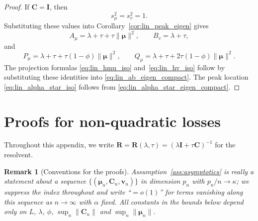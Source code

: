 \documentclass[11pt]{article}
\newcommand{\EE}{\mathbb{E}}
\newcommand{\I}{\mathbf{I}}
\newcommand{\C}{\mathbf{C}}
\newcommand{\bv}{\mathbf{v}}
\newcommand{\bmu}{\boldsymbol{\mu}}
\newcommand{\btheta}{\boldsymbol{\theta}}
\newtheorem{remark}{Remark}
\newcommand{\IS}[1]{\textcolor{blue}{{#1}}}
\begin{document}
\begin{proof}
If \(\C=\I\), then
\[
s_\mu^2=s_v^2=1.
\]
Substituting these values into Corollary~\ref{cor:lin_peak_eigen} gives
\[
A_\mu=\lambda+\tau+\tau\|\bmu\|^2,
\qquad
B_v=\lambda+\tau,
\]
and
\[
P_\mu=\lambda+\tau+\tau(1-\phi)\|\bmu\|^2,
\qquad
Q_\mu=\lambda+\tau+2\tau(1-\phi)\|\bmu\|^2.
\]
The projection formulas \eqref{eq:lin_hmu_iso} and~\eqref{eq:lin_hv_iso}
follow by substituting these identities into
\eqref{eq:lin_ab_eigen_compact}. The peak location
\eqref{eq:lin_alpha_star_iso} follows from
\eqref{eq:lin_alpha_star_eigen_compact}.
\end{proof}
\newpage
\section{Proofs for non-quadratic losses }
\label{app:proofs}

Throughout this appendix, we write
$\mathbf{R} = \mathbf{R}(\lambda,\tau) = (\lambda\I+\tau\C)^{-1}$ for the resolvent.

\begin{remark}[Conventions for the proofs]
\label{rem:conventions}
Assumption~\ref{ass:asymptotics} is really a statement about a
sequence $\{(\bmu_n, \C_n, \bv_n)\}$ in dimension $p_n$ with
$p_n/n\to\kappa$; we suppress the index throughout and write
``$=o(1)$'' for terms vanishing along this sequence as $n\to\infty$
with $\alpha$ fixed.  All constants in the bounds below depend only
on $L$, $\lambda$, $\phi$, $\sup_n\|\C_n\|$ and $\sup_n\|\bmu_n\|$.

\end{remark}

\end{document}
